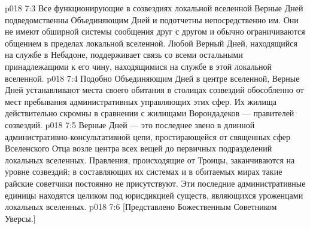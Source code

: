 \vs p018 7:3 Все функционирующие в созвездиях локальной вселенной Верные Дней подведомственны Объединяющим Дней и подотчетны непосредственно им. Они не имеют обширной системы сообщения друг с другом и обычно ограничиваются общением в пределах локальной вселенной. Любой Верный Дней, находящийся на службе в Небадоне, поддерживает связь со всеми остальными принадлежащими к его чину, находящимися на службе в этой локальной вселенной.
\vs p018 7:4 Подобно Объединяющим Дней в центре вселенной, Верные Дней устанавливают места своего обитания в столицах созвездий обособленно от мест пребывания административных управляющих этих сфер. Их жилища действительно скромны в сравнении с жилищами Ворондадеков --- правителей созвездий.
\vs p018 7:5 Верные Дней --- это последнее звено в длинной административно\hyp{}консультативной цепи, простирающейся от священных сфер Вселенского Отца возле центра всех вещей до первичных подразделений локальных вселенных. Правления, происходящие от Троицы, заканчиваются на уровне созвездий; в составляющих их системах и в обитаемых мирах такие райские советчики постоянно не присутствуют. Эти последние административные единицы находятся целиком под юрисдикцией существ, являющихся уроженцами локальных вселенных.
\vs p018 7:6 [Представлено Божественным Советником Уверсы.]
